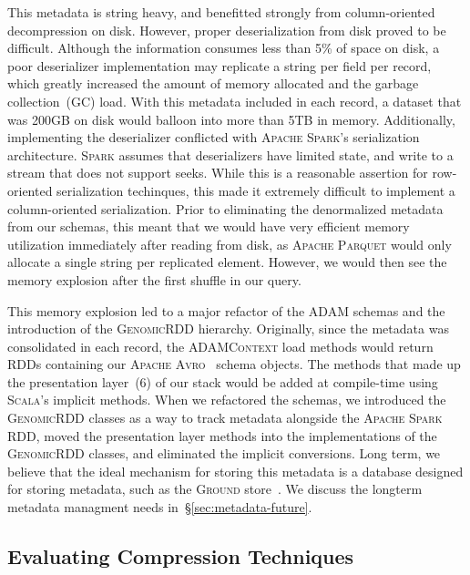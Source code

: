\documentclass[phd]{ucbthesis}
\begin{document}
This metadata is string heavy, and benefitted strongly from column-oriented
decompression on disk. However, proper deserialization from disk proved to be
difficult. Although the information consumes less than 5\% of space on disk, a
poor deserializer implementation may replicate a string per field per record,
which greatly increased the amount of memory allocated and the garbage
collection~(GC) load. With this metadata included in each record, a dataset
that was 200GB on disk would balloon into more than 5TB in memory. Additionally,
implementing the deserializer conflicted with \textsc{Apache Spark}'s
serialization architecture. \textsc{Spark} assumes that deserializers have
limited state, and write to a stream that does not support seeks. While this is
a reasonable assertion for row-oriented serialization techinques, this made it
extremely difficult to implement a column-oriented serialization. Prior to
eliminating the denormalized metadata from our schemas, this meant that we would
have very efficient memory utilization immediately after reading from disk, as
\textsc{Apache Parquet} would only allocate a single string per replicated
element. However, we would then see the memory explosion after the first shuffle
in our query.

This memory explosion led to a major refactor of the \textsc{ADAM} schemas and
the introduction of the \textsc{GenomicRDD} hierarchy. Originally, since the
metadata was consolidated in each record, the \textsc{ADAMContext} load methods
would return \textsc{RDD}s containing our \textsc{Apache Avro}~\cite{avro}
schema objects. The methods that made up the presentation layer~(6) of our stack
would be added at compile-time using \textsc{Scala}'s implicit methods. When we
refactored the schemas, we introduced the \textsc{GenomicRDD} classes as a way
to track metadata alongside the \textsc{Apache Spark} RDD, moved the
presentation layer methods into the implementations of the \textsc{GenomicRDD}
classes, and eliminated the implicit conversions. Long term, we believe that the
ideal mechanism for storing this metadata is a database designed for storing
metadata, such as the \textsc{Ground} store~\cite{hellerstein17}. We discuss the
longterm metadata managment needs in~\S\ref{sec:metadata-future}.

\subsection{Evaluating Compression Techniques}
\label{sec:compression}
\end{document}
